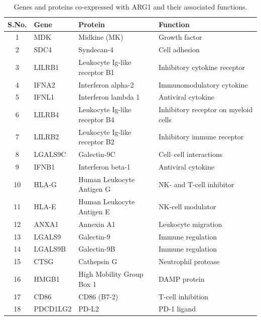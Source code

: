 \begin{table}[htbp]
  \centering
  \caption{Genes and proteins co-expressed with ARG1 and their associated functions.}
  \label{tab:arg1_coexpr}
  \small
  \begin{tabular}{clll}
    \hline
    \textbf{S.No.} & \textbf{Gene} & \textbf{Protein} & \textbf{Function} \\
    \hline
    1  & MDK       & Midkine (MK)                              & Growth factor \\
    2  & SDC4      & Syndecan-4                                & Cell adhesion \\
    3  & LILRB1    & Leukocyte Ig-like receptor B1             & Inhibitory cytokine receptor \\
    4  & IFNA2     & Interferon alpha-2                        & Immunomodulatory cytokine \\
    5  & IFNL1     & Interferon lambda 1                       & Antiviral cytokine \\
    6  & LILRB4    & Leukocyte Ig-like receptor B4             & Inhibitory receptor on myeloid cells \\
    7  & LILRB2    & Leukocyte Ig-like receptor B2             & Inhibitory immune receptor \\
    8  & LGALS9C   & Galectin-9C                               & Cell--cell interactions \\
    9  & IFNB1     & Interferon beta-1                         & Antiviral cytokine \\
    10 & HLA-G     & Human Leukocyte Antigen G                 & NK- and T-cell inhibitor \\
    11 & HLA-E     & Human Leukocyte Antigen E                 & NK-cell modulator \\
    12 & ANXA1     & Annexin A1                                & Leukocyte migration \\
    13 & LGALS9    & Galectin-9                                & Immune regulation \\
    14 & LGALS9B   & Galectin-9B                               & Immune regulation \\
    15 & CTSG      & Cathepsin G                               & Neutrophil protease \\
    16 & HMGB1     & High Mobility Group Box 1                 & DAMP protein \\
    17 & CD86      & CD86 (B7-2)                               & T-cell inhibition \\
    18 & PDCD1LG2  & PD-L2                                     & PD-1 ligand \\

\end{tabular}
\end{table}

